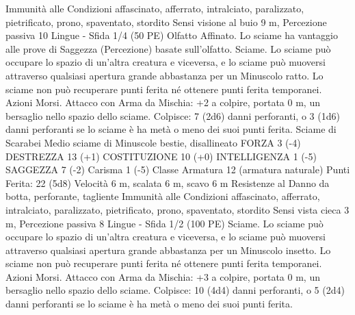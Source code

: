 \begin{multicols}{2}
Immunità alle Condizioni affascinato, afferrato, intralciato,
paralizzato, pietrificato, prono, spaventato, stordito
Sensi visione al buio 9 m, Percezione passiva 10
Lingue -
Sfida 1/4 (50 PE)
Olfatto Affinato. Lo sciame ha vantaggio alle prove di Saggezza
(Percezione) basate sull’olfatto.
Sciame. Lo sciame può occupare lo spazio di un’altra creatura e
viceversa, e lo sciame può muoversi attraverso qualsiasi apertura
grande abbastanza per un Minuscolo ratto. Lo sciame non può
recuperare punti ferita né ottenere punti ferita temporanei.
Azioni
Morsi. Attacco con Arma da Mischia: +2 a colpire, portata 0 m,
un bersaglio nello spazio dello sciame.
Colpisce: 7 (2d6) danni perforanti, o 3 (1d6) danni perforanti se
lo sciame è ha metà o meno dei suoi punti ferita.
Sciame di Scarabei
Medio sciame di Minuscole bestie, disallineato
FORZA 3 (-4)
DESTREZZA 13 (+1)
COSTITUZIONE 10 (+0)
INTELLIGENZA 1 (-5)
SAGGEZZA 7 (-2)
Carisma 1 (-5)
Classe Armatura 12 (armatura naturale)
\hspace*{0pt}\hfill{Punti Ferita}: 22 (5d8)
Velocità 6 m, scalata 6 m, scavo 6 m
Resistenze al Danno da botta, perforante, tagliente
Immunità alle Condizioni affascinato, afferrato, intralciato,
paralizzato, pietrificato, prono, spaventato, stordito
Sensi vista cieca 3 m, Percezione passiva 8
Lingue -
Sfida 1/2 (100 PE)
Sciame. Lo sciame può occupare lo spazio di un’altra creatura e
viceversa, e lo sciame può muoversi attraverso qualsiasi apertura
grande abbastanza per un Minuscolo insetto. Lo sciame non può
recuperare punti ferita né ottenere punti ferita temporanei.
Azioni
Morsi. Attacco con Arma da Mischia: +3 a colpire, portata 0 m,
un bersaglio nello spazio dello sciame.
Colpisce: 10 (4d4) danni perforanti, o 5 (2d4) danni perforanti se
lo sciame è ha metà o meno dei suoi punti ferita.
 

\end{multicols}
